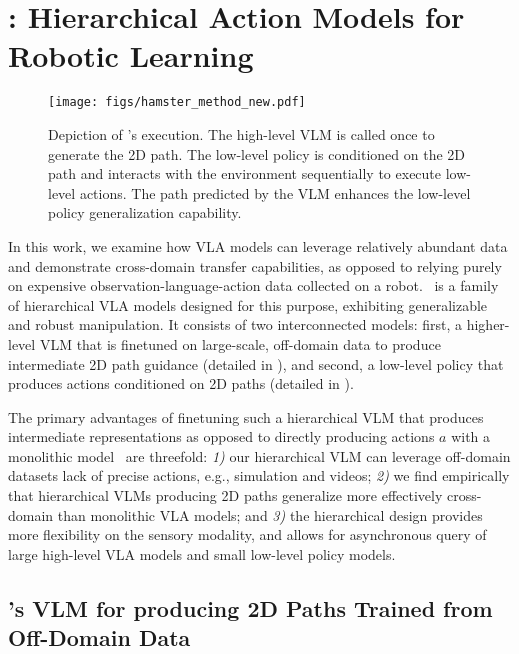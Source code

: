 \section{\method: Hierarchical Action Models for Robotic Learning}
\label{sec:method}
\begin{figure*}[!t]
    \centering
    \texttt{[image: figs/hamster\_method\_new.pdf]}
    \caption{\footnotesize{Depiction of \method 's execution. The high-level VLM is called once to generate the 2D path. The low-level policy is conditioned on the 2D path and interacts with the environment sequentially to execute low-level actions. The path predicted by the VLM enhances the low-level policy generalization capability.}
    }
    \vspace{-4mm}
    \label{fig:method}
\end{figure*}
In this work, we examine how VLA models can leverage relatively abundant data and demonstrate cross-domain transfer capabilities, as opposed to relying purely on expensive observation-language-action data collected on a robot. \method\ is a family of hierarchical VLA models designed for this purpose, exhibiting generalizable and robust manipulation. It consists of two interconnected models: first, a higher-level VLM that is finetuned on large-scale, off-domain data to produce intermediate 2D path guidance (detailed in ), and second, a low-level policy that produces actions conditioned on 2D paths (detailed in ).

The primary advantages of finetuning such a hierarchical VLM that produces intermediate representations as opposed to directly producing actions $a$ with a monolithic model~\citep{kim2024openvla, zitkovich2023rt,black2024pi0} are threefold: \emph{1)} our hierarchical VLM can leverage off-domain datasets lack of precise actions, e.g., simulation and videos; \emph{2)} we find empirically that hierarchical VLMs producing 2D paths generalize more effectively cross-domain than monolithic VLA models; and \emph{3)} the hierarchical design provides more flexibility on the sensory modality, and allows for asynchronous query of large high-level VLA models and small low-level policy models.


\subsection{\method's VLM for producing 2D Paths Trained from Off-Domain Data}
\label{sec:method:vlm}


